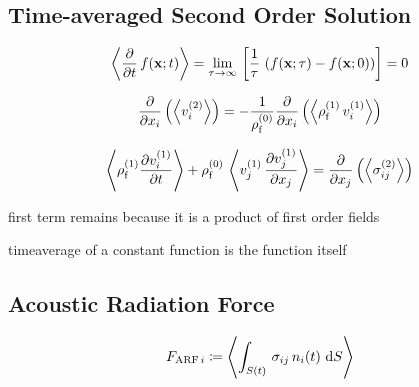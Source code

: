 \subsection{Time-averaged Second Order Solution\label{Th-avg-nd-order}}

\begin{equation}
  \left\langle \pdv{t}\,f(\vb{x};t) \right\rangle = \lim\limits_{\tau \rightarrow \infty}{\,
    \left[ \frac{1}{\tau}\,\left( f(\vb{x}; \tau) - f(\vb{x}; 0) \right) 
  \right]} = 0
  \label{eq:Th-avg-property}
\end{equation}


\begin{equation}
  \pdv{x_{i}}\left( \left\langle v_{i}^{(2)} \right\rangle \right) = 
  -\frac{1}{\rho_{\mathrm{f}}^{(0)}} \pdv{x_{i}}\left(\left\langle  
  \rho_{\mathrm{f}}^{(1)}\,v_{i}^{(1)}  \right\rangle\right)
  \label{eq:Th-avg-massconservatio}
\end{equation}

\begin{equation}
  \left\langle \rho_{\mathrm{f}}^{(1)} \pdv{  v_{i}^{(1)}  }{t} \right\rangle + 
  \rho_{\mathrm{f}}^{(0)}\,\left\langle v_{j}^{(1)}\,\pdv{  v_{j}^{(1)}  }{x_{j}} \right\rangle 
  = \pdv{x_{j}}\left( \left\langle \sigma_{ij}^{(2)} \right\rangle \right)
  \label{eq:Th-avg-navier}
\end{equation}

first term remains because it is a product of first order fields

timeaverage of a constant function is the function itself

\subsection{Acoustic Radiation Force\label{sec:Th-ARF}}

\begin{equation}
  F_{\mathrm{ARF}\,i} \coloneqq
  \left\langle \int_{S(t)}\,\sigma_{ij}\,n_{i}(t)\,\dd{S} \right\rangle
  \label{eq:Th-def-ARF}
\end{equation}

